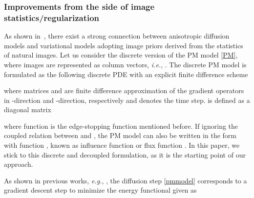 \documentclass[10pt,journal,compsoc]{IEEEtran}
\newcommand{\eg}{\emph{e.g.}}
\newcommand{\ie}{\emph{i.e.}}
\begin{document}
{\subsubsection{Improvements from the side of image statistics/regularization}
\label{improvements}
As shown in~\cite{relations, biased, KrajsekS10, ScharrBH03}, 
there exist a strong connection between anisotropic diffusion models and 
variational models adopting image priors derived from the statistics of natural images. 
Let us consider the discrete version of the PM model \eqref{PM}, where
images are represented as column vectors, \ie, . The discrete PM model is formulated as the following 
discrete PDE with an explicit finite difference scheme

where matrices  and  are
finite difference approximation of the gradient operators in
-direction and -direction, respectively and  denotes
the time step.  is defined as a
diagonal matrix

where function  is the edge-stopping function mentioned before. 
If ignoring the coupled relation between 
and , the PM model can also be written in the form  with function , known as influence function
\cite{ROBUSTANISOTROPIC} or flux function \cite{anisotropicbook}.  
In this paper, we stick to this discrete and decoupled formulation, 
as it is the starting point of our approach. 

As shown in previous works, \eg, \cite{relations, zhu1997prior}, 
the diffusion step \eqref{pmmodel} corresponds to a gradient descent 
step to minimize the energy functional given as 

}
\end{document}
